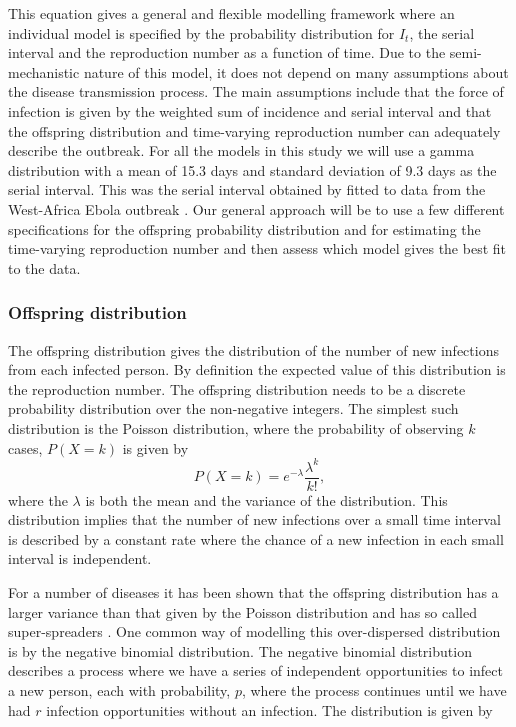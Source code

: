 \documentclass[12pt]{article}
\begin{document}
This equation gives a general and flexible modelling framework where an individual model is specified by the probability distribution for $I_t$, the serial interval and the reproduction number as a function of time. Due to the semi-mechanistic nature of this model, it does not depend on many assumptions about the disease transmission process. The main assumptions include that the force of infection is given by the weighted sum of incidence and serial interval and that the offspring distribution and time-varying reproduction number can adequately describe the outbreak. For all the models in this study we will use a gamma distribution with a mean of 15.3 days and standard deviation of 9.3 days as the serial interval. This was the serial interval obtained by fitted to data from the West-Africa Ebola outbreak \cite{whoebolaresponseteamEbolaVirusDisease2014}. Our general approach will be to use a few different specifications for the offspring probability distribution and for estimating the time-varying reproduction number and then assess which model gives the best fit to the data.

\subsubsection{Offspring distribution}
The offspring distribution gives the distribution of the number of new infections from each infected person. By definition the expected value of this distribution is the reproduction number. The offspring distribution needs to be a discrete probability distribution over the non-negative integers. The simplest such distribution is the Poisson distribution, where the probability of observing $k$ cases, $P(X=k)$ is given by
\[P(X=k) = e^{-\lambda}\frac{\lambda^k}{k!}, \]
where the $\lambda$ is both the mean and the variance of the distribution. This distribution implies that the number of new infections over a small time interval is described by a constant rate where the chance of a new infection in each small interval is independent.

For a number of diseases it has been shown that the offspring distribution has a larger variance than that given by the Poisson distribution and has so called super-spreaders \cite{lloyd-smithSuperspreadingEffectIndividual2005}. One common way of modelling this over-dispersed distribution is by the negative binomial distribution. The negative binomial distribution describes a process where we have a series of independent opportunities to infect a new person, each with probability, $p$, where the process continues until we have had $r$ infection opportunities without an infection. The distribution is given by
\end{document}
